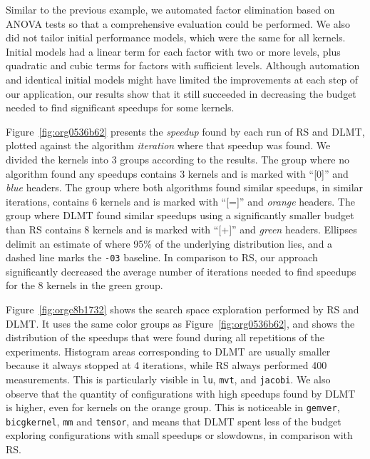 \documentclass[conference]{IEEEtran}
\begin{document}
Similar to the previous example, we  automated factor elimination based on ANOVA
tests so  that a comprehensive  evaluation could be  performed. We also  did not
tailor initial performance models, which were  the same for all kernels. Initial
models had a linear term for each factor with two or more levels, plus quadratic
and  cubic terms  for factors  with sufficient  levels. Although  automation and
identical initial models might have limited the improvements at each step of our
application, our results  show that it still succeeded in  decreasing the budget
needed to find significant speedups for some kernels.

Figure~\ref{fig:org0536b62} presents  the \emph{speedup} found by  each run of
RS and  DLMT, plotted  against the  algorithm \emph{iteration}  where that  speedup was
found. We divided the kernels into 3  groups according to the results. The group
where no  algorithm found  any speedups  contains 3 kernels  and is  marked with
``[0]''  and  \emph{blue}  headers.  The  group where  both  algorithms  found  similar
speedups, in similar  iterations, contains 6 kernels and is  marked with ``[=]''
and  \emph{orange}  headers. The  group  where  DLMT  found  similar speedups  using  a
significantly  smaller budget  than RS  contains 8  kernels and  is marked  with
``[+]'' and  \emph{green} headers.  Ellipses delimit  an estimate of  where 95\%  of the
underlying distribution lies, and a dashed line marks the \texttt{-03} baseline.
In comparison to RS, our approach  significantly decreased the average number of
iterations needed to find speedups for the 8 kernels in the green group.

Figure~\ref{fig:orgc8b1732} shows  the search space exploration  performed by RS
and DLMT. It uses the same color groups as Figure~\ref{fig:org0536b62},
and  shows  the  distribution  of  the  speedups  that  were  found  during  all
repetitions  of  the experiments.  Histogram  areas  corresponding to  DLMT  are
usually  smaller because  it always  stopped at  4 iterations,  while RS  always
performed  400  measurements. This  is  particularly  visible  in \texttt{lu},  \texttt{mvt},  and
\texttt{jacobi}. We also  observe that the quantity of configurations  with high speedups
found  by  DLMT is  higher,  even  for kernels  on  the  orange group.  This  is
noticeable in \texttt{gemver}, \texttt{bicgkernel}, \texttt{mm} and  \texttt{tensor}, and means that DLMT spent less
of  the budget  exploring configurations  with small  speedups or  slowdowns, in
comparison with RS.
\end{document}
